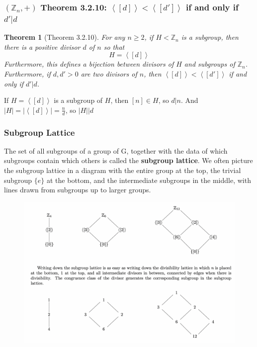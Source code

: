 \documentclass[11pt,a4paper]{article}
\newtheorem{theorem}{Theorem}
\begin{document}
\subsubsection{$(\mathbb{Z}_n,+)$ Theorem 3.2.10: $\left\langle [d]\right\rangle<\left\langle [d']\right\rangle$ if and only if $d'|d$}
\begin{theorem}[Theorem 3.2.10]
For any $n \geq 2$, if $H <\mathbb{Z}_n$ is a subgroup, then there is a positive divisor $d$ of $n$ so that $$H=\left\langle [d]\right\rangle$$
Furthermore, this deﬁnes a bijection between divisors of $H$ and subgroups of $\mathbb{Z}_n$. Furthermore, if $d, d'> 0$ are two divisors of $n$, then $\left\langle [d]\right\rangle<\left\langle [d']\right\rangle$ if and only if $d'|d$.
\end{theorem}
If $H=\left\langle [d]\right\rangle$ is a subgroup of $H$, then $[n]\in H$, so $d|n$. And $|H|=|\left\langle [d]\right\rangle|=\frac{n}{d}$, so $|H|\vert d$

\subsubsection{Subgroup Lattice}
The set of all subgroups of a group of G, together with the data of which subgroups contain which others is called the \textbf{subgroup lattice}. We often picture the subgroup lattice in a diagram with the entire group at the top, the trivial subgroup $\{ e \} $ at the bottom, and the intermediate subgroups in the middle, with lines drawn from subgroups up to larger groups.
\begin{center}\begin{figure}[htbp]
    \centering
    \includegraphics[scale=0.4]{lec1301.png}
    \caption{}
    \label{}
\end{figure}\end{center}
\end{document}
